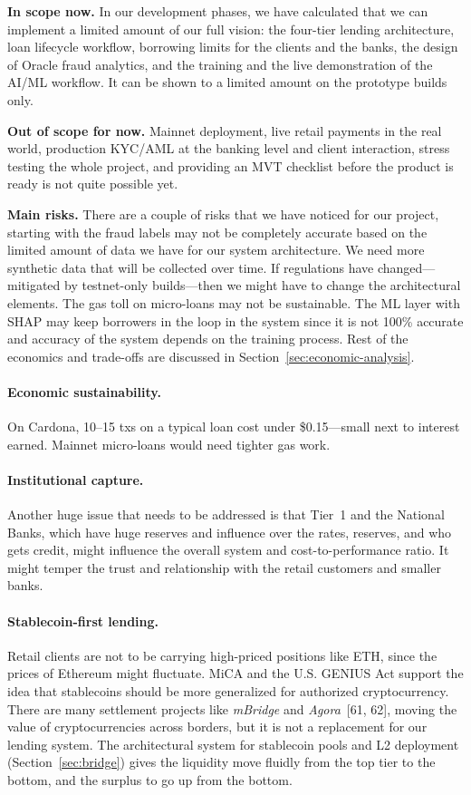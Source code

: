 \documentclass[12pt,a4paper]{report}
\begin{document}
\textbf{In scope now.} In our development phases, we have calculated that we can implement a limited amount of our full vision: the four-tier lending architecture, loan lifecycle workflow, borrowing limits for the clients and the banks, the design of Oracle fraud analytics, and the training and the live demonstration of the AI/ML workflow. It can be shown to a limited amount on the prototype builds only.

\textbf{Out of scope for now.} Mainnet deployment, live retail payments in the real world, production KYC/AML at the banking level and client interaction, stress testing the whole project, and providing an MVT checklist before the product is ready is not quite possible yet.

\textbf{Main risks.} There are a couple of risks that we have noticed for our project, starting with the fraud labels may not be completely accurate based on the limited amount of data we have for our system architecture. We need more synthetic data that will be collected over time. If regulations have changed---mitigated by testnet-only builds---then we might have to change the architectural elements. The gas toll on micro-loans may not be sustainable. The ML layer with SHAP may keep borrowers in the loop in the system since it is not 100\% accurate and accuracy of the system depends on the training process. Rest of the economics and trade-offs are discussed in Section~\ref{sec:economic-analysis}.

\paragraph{Economic sustainability.} On Cardona, 10--15 txs on a typical loan cost under \$0.15---small next to interest earned. Mainnet micro-loans would need tighter gas work.

\paragraph{Institutional capture.} Another huge issue that needs to be addressed is that Tier~1 and the National Banks, which have huge reserves and influence over the rates, reserves, and who gets credit, might influence the overall system and cost-to-performance ratio. It might temper the trust and relationship with the retail customers and smaller banks.

\paragraph{Stablecoin-first lending.}
\label{sec:stablecoin-first}
Retail clients are not to be carrying high-priced positions like ETH, since the prices of Ethereum might fluctuate. MiCA and the U.S. GENIUS Act support the idea that stablecoins should be more generalized for authorized cryptocurrency. There are many settlement projects like \textit{mBridge} and \textit{Agora}~[61, 62], moving the value of cryptocurrencies across borders, but it is not a replacement for our lending system. The architectural system for stablecoin pools and L2 deployment (Section~\ref{sec:bridge}) gives the liquidity move fluidly from the top tier to the bottom, and the surplus to go up from the bottom.
\end{document}
